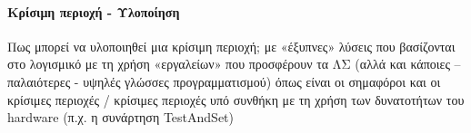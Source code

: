\paragraph{Κρίσιμη περιοχή - Υλοποίηση}

\indent Πως μπορεί να υλοποιηθεί μια κρίσιμη περιοχή;
με «έξυπνες» λύσεις που βασίζονται στο λογισμικό
με τη χρήση «εργαλείων» που προσφέρουν τα ΛΣ
(αλλά και κάποιες – παλαιότερες - υψηλές γλώσσες
προγραμματισμού) όπως είναι οι σημαφόροι και οι
κρίσιμες περιοχές / κρίσιμες περιοχές υπό συνθήκη
με τη χρήση των δυνατοτήτων του hardware (π.χ. η
συνάρτηση TestAndSet)

